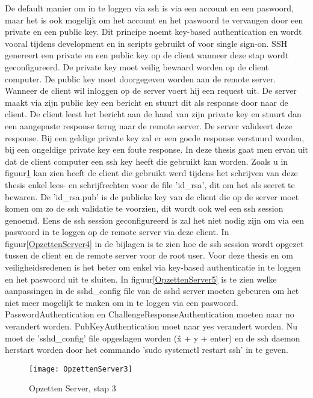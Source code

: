             De default manier om in te loggen via ssh is via een account en een paswoord, maar het is ook mogelijk om het account en het paswoord te vervangen door een private en een public key. Dit principe noemt key-based authentication en wordt vooral tijdens development en in scripts gebruikt of voor single sign-on. SSH genereert een private en een public key op de client wanneer deze stap wordt geconfigureerd. De private key moet veilig bewaard worden op de client computer. De public key moet doorgegeven worden aan de remote server. Wanneer de client wil inloggen op de server voert hij een request uit. De server maakt via zijn public key een bericht en stuurt dit als response door naar de client. De client leest het bericht aan de hand van zijn private key en stuurt dan een aangepaste response terug naar de remote server. De server valideert deze response. Bij een geldige private key zal er een goede response verstuurd worden, bij een ongeldige private key een foute response.
            In deze thesis gaat men ervan uit dat de client computer een ssh key heeft die gebruikt kan worden. Zoals u in figuur\ref{OpzettenServer3} kan zien heeft de client die gebruikt werd tijdens het schrijven van deze thesis enkel lees- en schrijfrechten voor de file 'id\_rsa', dit om het als secret te bewaren.
            De 'id\_rsa.pub' is de publieke key van de client die op de server moet komen om zo de ssh validatie te voorzien, dit wordt ook wel een ssh session genoemd. Eens de ssh session geconfigureerd is zal het niet nodig zijn om via een paswoord in te loggen op de remote server via deze client.
            In figuur\ref{OpzettenServer4} in de bijlagen is te zien hoe de ssh session wordt opgezet tussen de client en de remote server voor de root user.
            Voor deze thesis en om veiligheidsredenen is het beter om enkel via key-based authenticatie in te loggen en het paswoord uit te sluiten.
            In figuur\ref{OpzettenServer5} is te zien welke aanpassingen in de sshd\_config file van de sshd server moeten gebeuren om het niet meer mogelijk te maken om in te loggen via een paswoord. PasswordAuthentication en ChallengeResponseAuthentication moeten naar no verandert worden. PubKeyAuthentication moet naar yes verandert worden.
            Nu moet de 'sshd\_config' file opgeslagen worden (\^x + y + enter) en de ssh daemon herstart worden door het commando 'sudo systemctl restart ssh' in te geven.
            
            \begin{figure}
                \centering
                \texttt{[image: OpzettenServer3]}
                \caption{Opzetten Server, stap 3} \label{OpzettenServer3}
            \end{figure}
        
